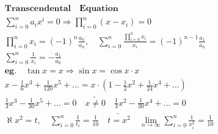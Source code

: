 \documentclass{article}
\begin{document}
\clearpage

\begin{align*}
    \bm{Transcendental \quad Equation} \\ 
    \sum_{i=0}^{n}a_{i}x^i = 0 \Longrightarrow \prod_{i=0}^{n}(x-x_{i})=0 \\ 
    \prod_{i=0}^{n}x_{i} = (-1)^{n}\frac{a_{0}}{a_{n}},\quad \sum_{i=0}^{n}\frac{\prod_{i=0}^{n}x_{i}}{x_{i}} = (-1)^{n-1}\frac{a_{1}}{a_{n}} \\ 
    \sum_{i=0}^{n}\frac{1}{x_{i}} = -\frac{a_{1}}{a_{0}} \\ 
    \bm{eg.} \quad \tan x = x \Longrightarrow \sin{x} = \cos{x} \cdot x \\
    x - \frac{1}{6}x^3 + \frac{1}{120}x^5 +... = x \cdot (1-\frac{1}{2}x^2+\frac{1}{24}x^4+...) \\
    \frac{1}{3}x^3-\frac{1}{30}x^5+... = 0 \quad \underrightarrow{x \not= 0} \quad \frac{1}{3}x^2-\frac{1}{30}x^4+... = 0 \\
    \aleph x^2 = t , \quad \sum_{i=0}^{n}\frac{1}{t_{i}} = \frac{1}{10} \quad \underrightarrow{t = x^2} \quad \lim_{n \to \infty}\sum_{i=0}^{n}\frac{1}{x_{i}^2} = \frac{1}{10} 
\end{align*}
\end{document}
